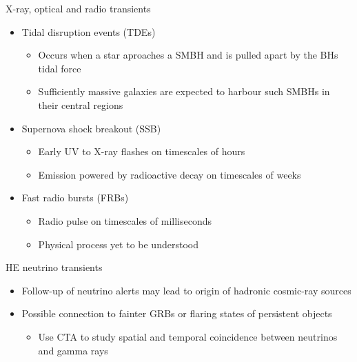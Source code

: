 \begin{frame}{X-ray, optical and radio transients}
  \begin{itemize}
    \item Tidal disruption events (TDEs)
    \begin{itemize}
      \item [\to] Occurs when a star aproaches a SMBH and is pulled apart by the BHs tidal force
      \item [\to] Sufficiently massive galaxies are expected to harbour such SMBHs in their central regions
    \end{itemize}
    \item Supernova shock breakout (SSB)
    \begin{itemize}
      \item [\to] Early UV to X-ray flashes on timescales of hours
      \item [\to] Emission powered by radioactive decay on timescales of weeks
    \end{itemize}
    \item Fast radio bursts (FRBs)
    \begin{itemize}
      \item [\to] Radio pulse on timescales of milliseconds
      \item [\to] Physical process yet to be understood
    \end{itemize}
  \end{itemize}
\end{frame}

\begin{frame}{HE neutrino transients}
  \begin{itemize}
    \item Follow-up of neutrino alerts may lead to origin of hadronic cosmic-ray sources
    \item Possible connection to fainter GRBs or flaring states of persistent objects
    \begin{itemize}
      \item [\to] Use CTA to study spatial and temporal coincidence between neutrinos and gamma rays
    \end{itemize}
  \end{itemize}
\end{frame}

